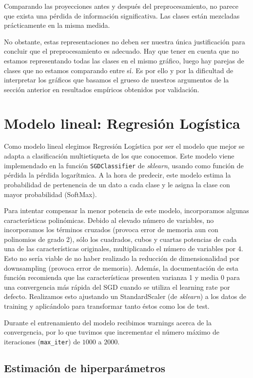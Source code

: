 \documentclass[a4]{article}
\begin{document}
Comparando las proyecciones antes y después del preprocesamiento, no
parece que exista una pérdida de información significativa. Las
clases están mezcladas prácticamente en la misma medida.

No obstante, estas representaciones no deben ser nuestra única
justificación para concluir que el preprocesamiento es adecuado. Hay
que tener en cuenta que no estamos representando todas las clases en
el mismo gráfico, luego hay parejas de clases que no estamos
comparando entre sí. Es por ello y por la dificultad de interpretar los
gráficos que basamos el grueso de nuestros argumentos de la sección
anterior en resultados empíricos obtenidos por validación.

\section{Modelo lineal: Regresión Logística}

Como modelo lineal elegimos Regresión Logística por ser el modelo que
mejor se adapta a clasificación multietiqueta de los que
conocemos. Este modelo viene implemendado en la función
\texttt{SGDClassifier} de \textit{sklearn}, usando como función de
pérdida la pérdida logarítmica. A la hora de predecir, este modelo
estima la probabilidad de pertenencia de un dato a cada clase y le
asigna la clase con mayor probabilidad (SoftMax).

Para intentar compensar la menor potencia de este modelo, incorporamos
algunas características polinómicas. Debido al elevado número de
variables, no incorporamos los términos cruzados (provoca error de
memoria aun con polinomios de grado 2), sólo los cuadrados, cubos y
cuartas potencias de cada una de las características originales,
multiplicando el número de variables por 4. Esto no sería viable de no
haber realizado la reducción de dimensionalidad por downsampling
(provoca error de memoria). Además, la documentación de esta función
recomienda que las características presenten varianza 1 y media 0 para
una convergencia más rápida del SGD cuando se utiliza el learning rate
por defecto. Realizamos esto ajustando un StandardScaler (de
\textit{sklearn}) a los datos de training y aplicándolo para
transformar tanto éstos como los de test.

Durante el entrenamiento del modelo recibimos warnings acerca de la convergencia, por lo que tuvimos que incrementar el número máximo de iteraciones (\texttt{max\_iter}) de $1000$ a $2000$. 

\subsection{Estimación de hiperparámetros}
\end{document}
